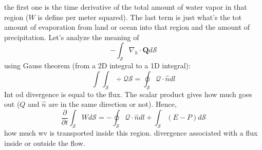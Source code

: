 the first one is the time derivative of the total amount of water vapor in that region ($W$ is define per meter squared). The last term is just what's the tot amount of evaporation from land or ocean into that region and the amount of precipitation. 
Let's analyze the meaning of 
\[-\int_{\mathcal{S}}\nabla_h\cdot\mathbf{Q}d\mathcal{S}\]
using Gauss theorem (from a 2D integral to a 1D integral):
\begin{equation}\label{eq.Gauss theorem}
    \int\int_{\mathcal{S}}\div{\mathcal{Q}}\mathcal{S}=\oint_{\mathcal{S}} \mathcal{Q}\cdot \hat{n}dl
\end{equation}
Int od divergence is equal to the flux. The scalar product gives how much goes out ($Q$ and $\hat{n}$ are in the same direction or not). Hence, 
\[\frac{\partial}{\partial t}\int_{\mathcal{S}}Wd\mathcal{S}=-\oint_{\mathcal{S}} \mathcal{Q}\cdot \hat{n}dl+\int_{\mathcal{S}}(E-P)d\mathcal{S}\]
how much wv is transported inside this region. divergence associated with a flux inside or outside the flow. 


